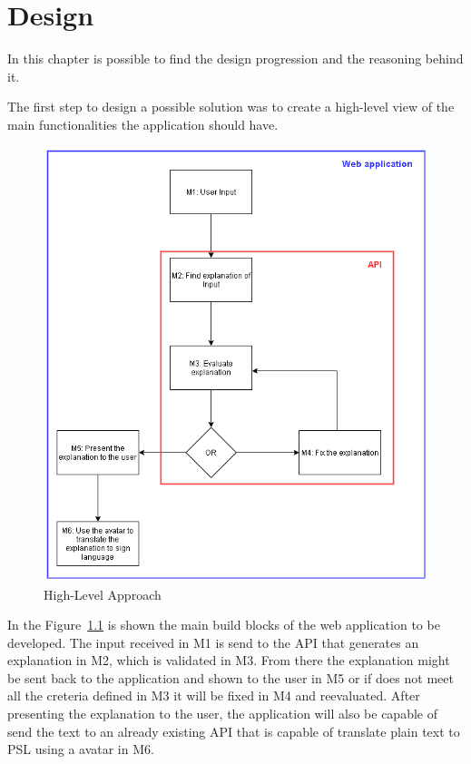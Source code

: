 
\chapter{Design} %
\label{chap:Chapter4} 

In this chapter is possible to find the design progression and the reasoning behind it.

The first step to design a possible solution was to create a high-level view of the main functionalities the application should have.

\begin{figure}[H]
\centering
\includegraphics[scale=0.5]{ch4/assets/diagram1_2.png}
\caption[High-Level Approach]{High-Level Approach}
\label{fig:Diagram1}
\end{figure}

In the Figure~\ref{fig:Diagram1} is shown the main build blocks of the web application to be developed.
The input received in M1 is send to the \gls{API} that generates an explanation in M2, which is validated in M3.
From there the explanation might be sent back to the application and shown to the user in M5  or if does not meet all the creteria defined in M3 it will be fixed in M4 and reevaluated.
After presenting the explanation to the user, the application will also be capable of send the text to an already existing \gls{API} that is capable of translate plain text to \gls{PSL} using a avatar in M6.

